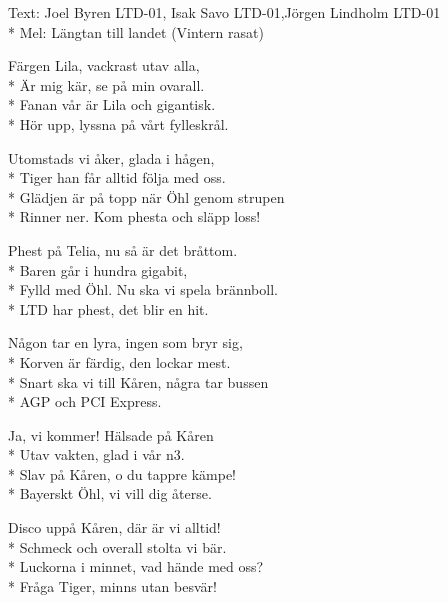 \begin{SongText}
    \begin{SongInfo}
        Text: Joel Byren LTD-01, Isak Savo LTD-01,Jörgen Lindholm LTD-01\\*%
        Mel: Längtan till landet (Vintern rasat)
    \end{SongInfo}
    \begin{SongVerse}
        Färgen Lila, vackrast utav alla,\\*%
        Är mig kär, se på min ovarall.\\*%
        Fanan vår är Lila och gigantisk.\\*%
        Hör upp, lyssna på vårt fylleskrål.
    \end{SongVerse}
    \begin{SongVerse}
        Utomstads vi åker, glada i hågen,\\*%
        Tiger han får alltid följa med oss.\\*%
        Glädjen är på topp när Öhl genom strupen\\*%
        Rinner ner. Kom phesta och släpp loss!
    \end{SongVerse}
    \begin{SongVerse}
        Phest på Telia, nu så är det bråttom.\\*%
        Baren går i hundra gigabit,\\*%
        Fylld med Öhl. Nu ska vi spela brännboll.\\*%
        LTD har phest, det blir en hit.
    \end{SongVerse}
    \begin{SongVerse}
        Någon tar en lyra, ingen som bryr sig,\\*%
        Korven är färdig, den lockar mest.\\*%
        Snart ska vi till Kåren, några tar bussen\\*%
        AGP och PCI Express.
    \end{SongVerse}
    \begin{SongVerse}
        Ja, vi kommer! Hälsade på Kåren\\*%
        Utav vakten, glad i vår n3.\\*%
        Slav på Kåren, o du tappre kämpe!\\*%
        Bayerskt Öhl, vi vill dig återse.
    \end{SongVerse}
    \begin{SongVerse}
        Disco uppå Kåren, där är vi alltid!\\*%
        Schmeck och overall stolta vi bär.\\*%
        Luckorna i minnet, vad hände med oss?\\*%
        Fråga Tiger, minns utan besvär!
    \end{SongVerse}
\end{SongText}

